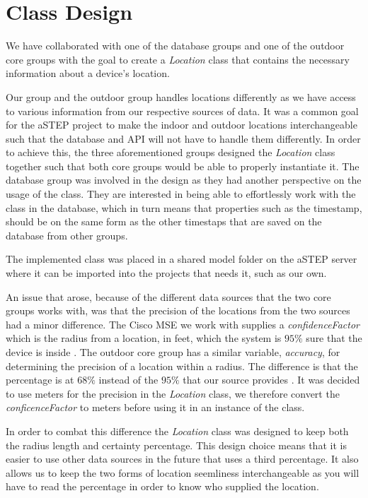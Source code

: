 \section{Class Design}\label{sec:class_design}
We have collaborated with one of the database groups and one of the outdoor core groups with the goal to create a \textit{Location} class that contains the necessary information about a device's location. 

Our group and the outdoor group handles locations differently as we have access to various information from our respective sources of data. It was a common goal for the aSTEP project to make the indoor and outdoor locations interchangeable such that the database and API will not have to handle them differently. In order to achieve this, the three aforementioned groups designed the \textit{Location} class together such that both core groups would be able to properly instantiate it. The database group was involved in the design as they had another perspective on the usage of the class. They are interested in being able to effortlessly work with the class in the database, which in turn means that properties such as the timestamp, should be on the same form as the other timestaps that are saved on the database from other groups. 

The implemented class was placed in a shared model folder on the aSTEP server %
where it can be imported into the projects that needs it, such as our own. 

An issue that arose, because of the different data sources that the two core groups works with, was that the precision of the locations from the two sources had a minor difference. The Cisco MSE we work with supplies a \textit{confidenceFactor} which is the radius from a location, in feet, which the system is $95\%$ sure that the device is inside \cite{MSE_faq}. The outdoor core group has a similar variable, \textit{accuracy}, for determining the precision of a location within a radius. The difference is that the percentage is at $68\%$ instead of the $95\%$ that our source provides \cite{android_getAccuracy}. It was decided to use meters for the precision in the \textit{Location} class, we therefore convert the \textit{conficenceFactor} to meters before using it in an instance of the class. 

In order to combat this difference the \textit{Location} class was designed to keep both the radius length and certainty percentage. This design choice means that it is easier to use other data sources in the future that uses a third percentage. It also allows us to keep the two forms of location seemliness interchangeable as you will have to read the percentage in order to know who supplied the location.